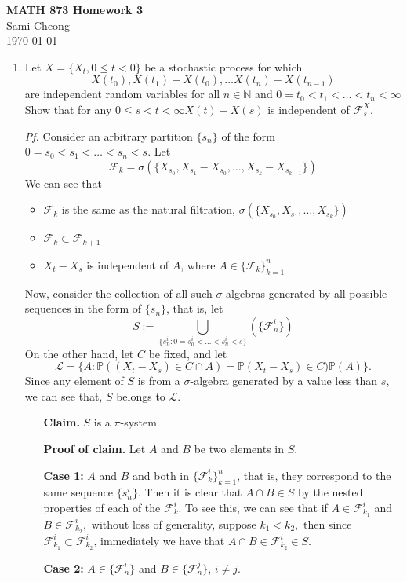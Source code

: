 \documentclass[11pt]{article}
\newcommand{\F}{{\mathcal F}}
\newcommand{\LL}{{\mathcal L}}
\newcommand{\pr}{{\mathbb P}}
\newcommand{\N}{{\mathbb N}}
\begin{document}
 
\begin{center}
{\bf \large MATH 873 Homework 3}
\\
Sami Cheong
\\
\today
\end{center}
\begin{enumerate}
\item Let $X = \{X_t, 0 \leq t < 0\}$ be a stochastic process for which 
\[ X(t_0), X(t_1)-X(t_0), \dots X(t_n)-X(t_{n-1})\]
 are independent random variables for all $n \in \N $ and $0 = t_0 < t_1 < \dots < t_n <\infty$
 Show that for any $0 \leq s < t < \infty X(t) - X(s)$ is independent of $\F^{X}_s.$ 
\item [\textit{Pf.}] Consider an arbitrary partition $\{s_n\}$ of the form $0=s_0 < s_1 <\dots <s_n <s.$  Let
\[
\F_{k}=\sigma(\{X_{s_0},X_{s_1}-X_{s_0},\dots,X_{s_k}-X_{s_{k-1}}\})
\]
We can see that
\begin{itemize}
\item $\F_{k}$ is the same as the natural filtration, $\sigma(\{X_{s_0},X_{s_1},\dots,X_{s_k}\})$
\item $\F_k \subset \F_{k+1}$
\item$X_t - X_s$ is independent of $A$, where $A\in \{\F_k\}_{k=1}^{n}$
\end{itemize}
Now, consider the collection of all such $\sigma$-algebras generated by all possible sequences in the form of $\{s_n\}$, that is, let
\[
S := \bigcup_{\{s^{i}_n: 0 = s^{i}_0 <\dots<s^{i}_n <s\}} (\{ \F^{i}_n\})
\]
On the other hand, let $C$ be fixed, and let 
\[
\LL = \{A : \pr((X_t-X_s)\in C \cap A) =\pr(X_t-X_s)\in C)\pr(A)\}.
\]
 Since any element of $S$  is from a $\sigma$-algebra generated by a value less than $s$, we can see that, $S$ belongs to $\LL.$ 
 \newpage
\begin{itemize}
\item []\textbf{Claim.} $S$ is a $\pi$-system
\item[]\textbf{Proof of claim.} Let $A$ and $B$ be two elements in $S$.
\item[]\textbf{Case 1:} $A$ and $B$ and both in $\{\F^{i}_{k}\}_{k=1}^{n}$, that is, they correspond to the same sequence $\{s_n^i\}.$ Then it is clear that $A\cap B \in S$ by the nested properties of each of the $\F^{i}_{k}$. To see this, we can see that if $A\in \F^{i}_{k_1}$ and $B \in \F^{i}_{k_2},$ without loss of generality, suppose $k_1 < k_2,$ then since $\F^{i}_{k_1} \subset \F^{i}_{k_2}$, immediately we have that $A\cap B \in \F^i_{k_2} \in S.$
\item[] \textbf{Case 2: } $A \in \{\F^{i}_n\}$ and $B \in \{\F^{j}_n\}$, $i \not=j.$

\end{itemize}
\end{enumerate}
\end{document}
